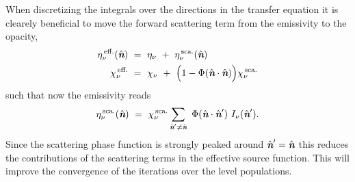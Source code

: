 \documentclass[a4paper,fleqn,usenatbib]{mnras}
\newcommand{\n}{\hat{\textit{\textbf{n}}}}
\begin{document}
When discretizing the integrals over the directions in the transfer equation it is clearely beneficial to move the forward scattering term from the emissivity to the opacity,
\begin{equation}
\begin{split}
		\eta^{\,\text{eff.}}_{\nu}(\n) \ &= \ \eta_{\nu} \ + \ \eta^{\,\text{sca.}}_{\nu}(\n) \\
		\chi^{\,\text{eff.}}_{\nu}     \ &= \ \chi_{\nu} \ + \ \Big(1 - \Phi(\n\cdot\n)\Big)\chi^{\,\text{sca.}}_{\nu}
\end{split}
\label{scattering}
\end{equation}
such that now the emissivity reads
\begin{equation}
	\eta^{\,\text{sca.}}_{\nu}(\n) \ = \ \chi^{\,\text{sca.}}_{\nu} \sum_{\n' \neq \n} \ \Phi(\n\cdot\n') \ I_{\nu}(\n').
\label{etasca}
\end{equation}
Since the scattering phase function is strongly peaked around $\n' = \n$ this reduces the contributions of the scattering terms in the effective source function. This will improve the convergence of the iterations over the level populations.




\bsp	%
\label{lastpage}
\end{document}

